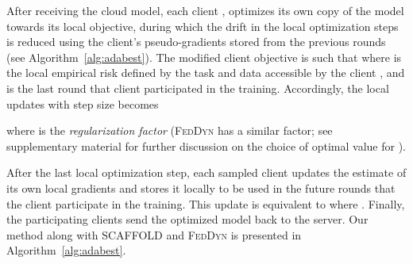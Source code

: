 \documentclass[runningheads]{llncs}
\def\algref#1{Algorithm~\ref{#1}}
\newcommand{\scaffold}{\textsc{SCAFFOLD}\xspace}
\newcommand{\feddyn}{\textsc{FedDyn}\xspace}
\newcommand{\ours}{\textsc{AdaBest}\xspace}
\begin{document}
After receiving the cloud model, each client , optimizes its own copy of the model towards its local objective, during which the drift in the local optimization steps is reduced using the client's pseudo-gradients stored from the previous rounds (see \algref{alg:adabest}). 
The modified client objective is  such that 
 where  is the local empirical risk defined by the task and data accessible by the client , and  is the last round that client  participated in the training.
Accordingly, the local updates with step size  becomes

where  is the \emph{regularization factor} (\feddyn has a similar factor; see supplementary material for further discussion on the choice of optimal value for ).

After the last local optimization step, each sampled client updates the estimate of its own local gradients and stores it locally to be used in the future rounds that the client participate in the training.
This update is equivalent to  where . Finally, the participating clients send the optimized model  back to the server. Our method along with \scaffold and \feddyn is presented in \algref{alg:adabest}. 


\end{document}

